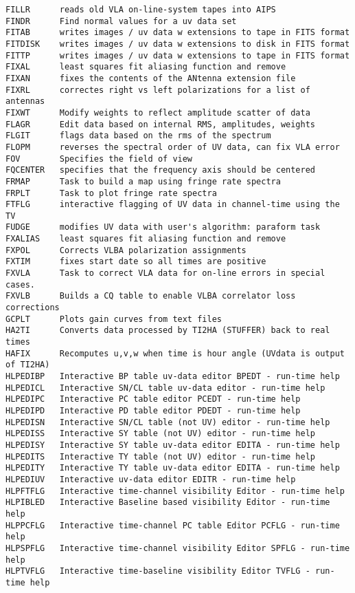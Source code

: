 \begin{verbatim}
FILLR      reads old VLA on-line-system tapes into AIPS
FINDR      Find normal values for a uv data set
FITAB      writes images / uv data w extensions to tape in FITS format
FITDISK    writes images / uv data w extensions to disk in FITS format
FITTP      writes images / uv data w extensions to tape in FITS format
FIXAL      least squares fit aliasing function and remove
FIXAN      fixes the contents of the ANtenna extension file
FIXRL      correctes right vs left polarizations for a list of antennas
FIXWT      Modify weights to reflect amplitude scatter of data
FLAGR      Edit data based on internal RMS, amplitudes, weights
FLGIT      flags data based on the rms of the spectrum
FLOPM      reverses the spectral order of UV data, can fix VLA error
FOV        Specifies the field of view
FQCENTER   specifies that the frequency axis should be centered
FRMAP      Task to build a map using fringe rate spectra
FRPLT      Task to plot fringe rate spectra
FTFLG      interactive flagging of UV data in channel-time using the TV
FUDGE      modifies UV data with user's algorithm: paraform task
FXALIAS    least squares fit aliasing function and remove
FXPOL      Corrects VLBA polarization assignments
FXTIM      fixes start date so all times are positive
FXVLA      Task to correct VLA data for on-line errors in special cases.
FXVLB      Builds a CQ table to enable VLBA correlator loss corrections
GCPLT      Plots gain curves from text files
HA2TI      Converts data processed by TI2HA (STUFFER) back to real times
HAFIX      Recomputes u,v,w when time is hour angle (UVdata is output of TI2HA)
HLPEDIBP   Interactive BP table uv-data editor BPEDT - run-time help
HLPEDICL   Interactive SN/CL table uv-data editor - run-time help
HLPEDIPC   Interactive PC table editor PCEDT - run-time help
HLPEDIPD   Interactive PD table editor PDEDT - run-time help
HLPEDISN   Interactive SN/CL table (not UV) editor - run-time help
HLPEDISS   Interactive SY table (not UV) editor - run-time help
HLPEDISY   Interactive SY table uv-data editor EDITA - run-time help
HLPEDITS   Interactive TY table (not UV) editor - run-time help
HLPEDITY   Interactive TY table uv-data editor EDITA - run-time help
HLPEDIUV   Interactive uv-data editor EDITR - run-time help
HLPFTFLG   Interactive time-channel visibility Editor - run-time help
HLPIBLED   Interactive Baseline based visibility Editor - run-time help
HLPPCFLG   Interactive time-channel PC table Editor PCFLG - run-time help
HLPSPFLG   Interactive time-channel visibility Editor SPFLG - run-time help
HLPTVFLG   Interactive time-baseline visibility Editor TVFLG - run-time help

\end{verbatim}
